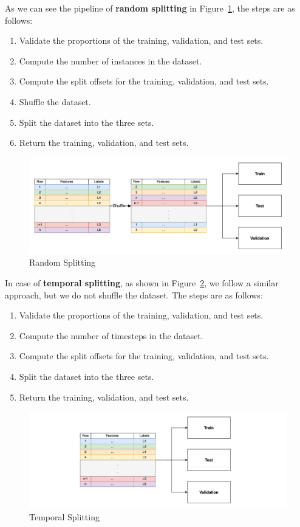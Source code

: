 \documentclass[review]{AIM_report}
\begin{document}
As we can see the pipeline of \textbf{random splitting} in Figure~\ref{fig:random_split}, the steps are as follows:
\begin{enumerate}
    \item Validate the proportions of the training, validation, and test sets.
    \item Compute the number of instances in the dataset.
    \item Compute the split offsets for the training, validation, and test sets.
    \item Shuffle the dataset.
    \item Split the dataset into the three sets.
    \item Return the training, validation, and test sets.
\end{enumerate}

\begin{figure}
    \centering
    \includegraphics[width=1\textwidth]{files/splitting/random_split.png}
    \caption{Random Splitting}
    \label{fig:random_split}
\end{figure}

In case of \textbf{temporal splitting}, as shown in Figure~\ref{fig:temporal_split}, we follow a similar approach, but we do not shuffle the dataset. The steps are as follows:
\begin{enumerate}
    \item Validate the proportions of the training, validation, and test sets.
    \item Compute the number of timesteps in the dataset.
    \item Compute the split offsets for the training, validation, and test sets.
    \item Split the dataset into the three sets.
    \item Return the training, validation, and test sets.
\end{enumerate}

\newpage

\begin{figure}
    \centering
    \includegraphics[width=1\textwidth]{files/splitting/temporal_split.png}
    \caption{Temporal Splitting}
    \label{fig:temporal_split}
\end{figure}
\end{document}
